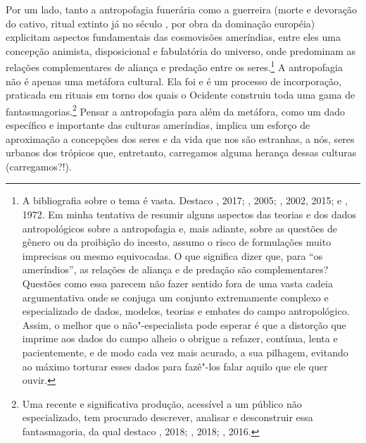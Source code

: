 Por um lado, tanto a antropofagia funerária como a guerreira (morte e
devoração do cativo, ritual extinto já no século , por obra da
dominação européia) explicitam aspectos fundamentais das cosmovisões
ameríndias, entre eles uma concepção animista, disposicional e
fabulatória do universo, onde predominam as relações complementares de
aliança e predação entre os seres.\footnote{A bibliografia sobre o tema
  é vasta. Destaco , 2017; , 2005; ,
  2002, 2015; e , 1972. Em minha tentativa de resumir alguns
  aspectos das teorias e dos dados antropológicos sobre a antropofagia
  e, mais adiante, sobre as questões de gênero ou da proibição do
  incesto, assumo o risco de formulações muito imprecisas ou mesmo
  equivocadas. O que significa dizer que, para ``os ameríndios'', as
  relações de aliança e de predação são complementares? Questões como
  essa parecem não fazer sentido fora de uma vasta cadeia argumentativa
  onde se conjuga um conjunto extremamente complexo e especializado de
  dados, modelos, teorias e embates do campo antropológico. Assim, o
  melhor que o não"-especialista pode esperar é que a distorção que
  imprime aos dados do campo alheio o obrigue a refazer, contínua, lenta
  e pacientemente, e de modo cada vez mais acurado, a sua pilhagem,
  evitando ao máximo torturar esses dados para fazê"-los falar aquilo que
  ele quer ouvir.} A antropofagia não é apenas uma metáfora cultural.
Ela foi e é um processo de incorporação, praticada em rituais em torno
dos quais o Ocidente construiu toda uma gama de
fantasmagorias.\footnote{Uma recente e significativa produção, acessível
  a um público não especializado, tem procurado descrever, analisar e
  desconstruir essa fantasmagoria, da qual destaco , 2018;
  , 2018; , 2016.} Pensar a antropofagia para além da
metáfora, como um dado específico e importante das culturas ameríndias,
implica um esforço de aproximação a concepções dos seres e da vida que
nos são estranhas, a nós, seres urbanos dos trópicos que, entretanto,
carregamos alguma herança dessas culturas (carregamos?!).

